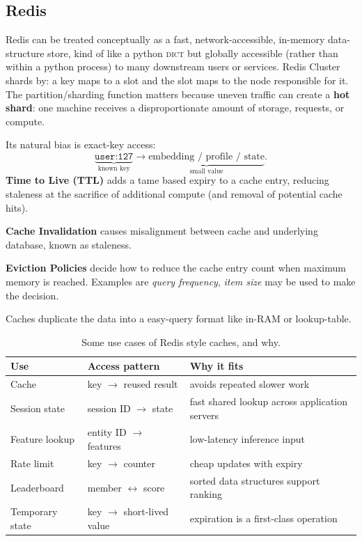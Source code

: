 \subsection{Redis}
\label{subsec:redis}

Redis can be treated conceptually as a fast, network-accessible, in-memory data-structure store, kind of like a python \textsc{dict} but globally accessible (rather than within a python process) to many downstream users or services.
Redis Cluster shards by: a key maps to a slot and the slot maps to the node responsible for it.
The partition/sharding function matters because uneven traffic can create a \textbf{hot shard}: one machine receives a disproportionate amount of storage, requests, or compute.

Its natural bias is exact-key access:
\[
    \underbrace{\texttt{user:127}}_{\text{known key}}
    \rightarrow
    \underbrace{\text{embedding / profile / state}}_{\text{small value}}.
\]
\textbf{Time to Live (TTL)} adds a tame based expiry to a cache entry, reducing staleness at the sacrifice of additional compute (and removal of potential cache hits).

\textbf{Cache Invalidation} causes misalignment between cache and underlying database, known as staleness.

\textbf{Eviction Policies} decide how to reduce the cache entry count when maximum memory is reached.
Examples are \textit{query frequency}, \textit{item size} may be used to make the decision. 

\begin{calloutintuition}
    Caches duplicate the data into a easy-query format like in-RAM or lookup-table.
\end{calloutintuition}

\begin{table}[htbp]
    \centering
    \caption{Some use cases of Redis style caches, and why.}
    \label{tab:redis-use-cases}
    \begin{tabularx}{\linewidth}{@{}lXX@{}}
    \toprule
    \textbf{Use} & \textbf{Access pattern} & \textbf{Why it fits} \\
    \midrule
    Cache & key \(\rightarrow\) reused result & avoids repeated slower work \\
    Session state & session ID \(\rightarrow\) state & fast shared lookup across application servers \\
    Feature lookup & entity ID \(\rightarrow\) features & low-latency inference input \\
    Rate limit & key \(\rightarrow\) counter & cheap updates with expiry \\
    Leaderboard & member \(\leftrightarrow\) score & sorted data structures support ranking \\
    Temporary state & key \(\rightarrow\) short-lived value & expiration is a first-class operation \\
    \bottomrule
    \end{tabularx}
\end{table}


